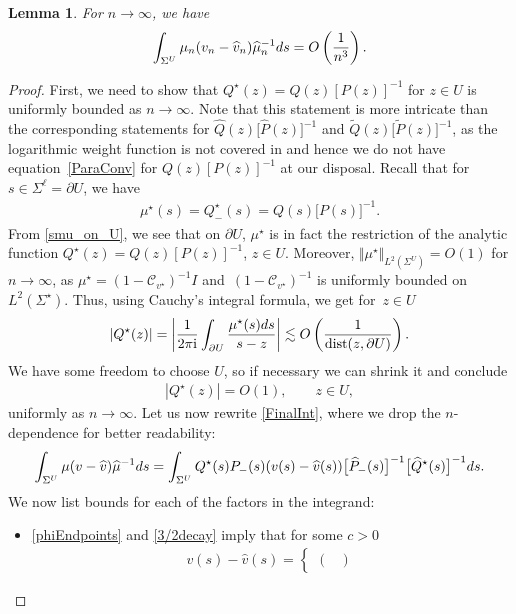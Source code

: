 \documentclass[11pt]{article}
\numberwithin{equation}{section}
\newcommand{\Id}{I}
\newcommand{\bQ}{ Q}
\newcommand{\hQ}{{\widehat Q}}
\newcommand{\tQ}{{\widetilde Q}}
\newcommand{\sbQ}{Q^\star}
\newcommand{\shQ}{{\widehat Q^\star}}
\newcommand{\smu}{\mu^\star}
\newcommand{\bmu}{{\mu}}
\newcommand{\hmu}{{\widehat \mu}}
\newcommand{\bP}{P}
\newcommand{\hP}{{\widehat P}}
\newcommand{\tP}{{\widetilde P}}
\newcommand{\bv}{v}
\newcommand{\hv}{{\widehat v}}
\newcommand{\sCauv}{\mathcal C_{\bv^\star}}
\newcommand{\I}{\mathrm{i}}
\newcommand{\dist}{\mathop{\mathrm{dist}}}
\newtheorem{Lemma}[Theorem]{Lemma}
\numberwithin{equation}{section}
\begin{document}
\begin{Lemma}\label{FinalLemma}
For $n \to \infty$, we have
\begin{align}\label{FinalInt}
 \int_{ \Sigma^U} \bmu_n(\bv_n-\hv_n)\hmu_n^{-1} {\rm d}s = O\left(\frac{1}{n^3}\right).
\end{align}
\end{Lemma}
\begin{proof}
First, we need to show that $\sbQ(z) = \bQ(z)[\bP(z)]^{-1}$ for $z \in U$ is uniformly bounded as $n \to \infty$. Note that this statement is more intricate than the corresponding statements for $\hQ(z)\big[\hP(z)\big]^{-1}$ and $\tQ(z)\big[\tP(z)\big]^{-1}$, as the logarithmic weight function is not covered in \cite{KMVV} and hence we do not have equation~\eqref{ParaConv} for $\bQ(z)[\bP(z)]^{-1}$ at our disposal. Recall that for~${s\!\in\! \Sigma^\ell = \partial U}$, we have
\begin{align}\label{smu_on_U}
 \smu(s) = \sbQ_-(s) = \bQ(s)\big[\bP(s)\big]^{-1}.
\end{align}
From \eqref{smu_on_U}, we see that on $\partial U$, $\smu$ is in fact the restriction of the analytic function $\sbQ(z) = \bQ(z)[\bP(z)]^{-1}$, $z\in U$. Moreover, $\Vert \smu \Vert_{L^2( \Sigma^U)} = O(1)$ for $n \to \infty$, as $\smu = (1-\sCauv)^{-1}\Id$ and~${(1-\sCauv)^{-1}}$ is uniformly bounded on $L^2(\Sigma^\star)$. Thus, using Cauchy's integral formula, we get for~$z \in U$
\begin{align*}
 |\sbQ(z)| = \bigg|\frac{1}{2\pi\I} \int_{\partial U} \frac{\smu(s){\rm d}s}{s-z}\bigg| \lesssim O\left(\frac{1}{\dist(z,\partial U)}\right).
\end{align*}
We have some freedom to choose $U$, so if necessary we can shrink it and conclude
\begin{align}\label{Qstar}
 |\sbQ(z)| = O(1), \qquad z\in U,
\end{align}
uniformly as $n \to \infty$. Let us now rewrite \eqref{FinalInt}, where we drop the $n$-dependence for better readability:
\begin{align}\label{FinalInt2}
 \int_{ \Sigma^U} \bmu(\bv-\hv)\hmu^{-1} {\rm d}s = \int_{ \Sigma^U} \sbQ(s)\bP_-(s)(\bv(s)-\hv(s))\big[\hP_-(s)\big]^{-1}\big[\shQ(s)\big]^{-1} {\rm d}s.
\end{align}
We now list bounds for each of the factors in the integrand:
\begin{itemize}\itemsep=0pt
 \item \eqref{phiEndpoints} and \eqref{3/2decay} imply that for some $c > 0$
 \begin{align*}\bv(s)-\hv(s) =\begin{cases} \begin{pmatrix}

\end{pmatrix}
\end{cases}
\end{align*}
\end{itemize}
\end{proof}
\end{document}
